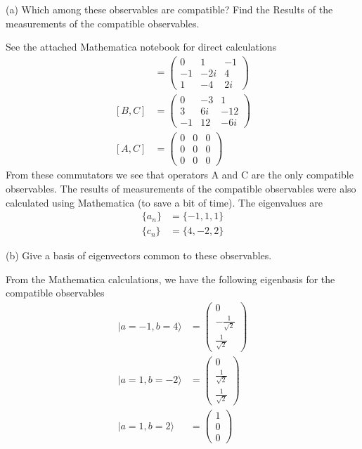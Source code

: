\documentclass[a4paper, 11pt]{article}
\newcommand{\ket}[1]{|#1\rangle}
\newenvironment{solution}{%
	\begin{list}{}{%
			\setlength{\topsep}{0pt}%
			\setlength{\leftmargin}{1.5cm}%
			\setlength{\rightmargin}{1.5cm}%
			\setlength{\listparindent}{\parindent}%
			\setlength{\itemindent}{\parindent}%
			\setlength{\parsep}{\parskip}%
		}%
		\item[]}{\end{list}}
\begin{document}
\noindent (a) Which among these observables are compatible? Find the Results of the measurements of the compatible observables. 
	\begin{solution}
		See the attached Mathematica notebook for direct calculations 
			\begin{align*}
				[A, B] &= \begin{pmatrix}
					0 & 1 & -1 \\ 
					-1 & -2i & 4 \\ 
					1 & -4 & 2i
				\end{pmatrix} \\ 
				[B, C] &= \begin{pmatrix}
					0 & -3 & 1 \\ 
					3 & 6i & -12 \\ 
					-1 & 12 & -6i
				\end{pmatrix} \\ 
				[A,C] &= \begin{pmatrix}
					0 & 0 & 0 \\ 
					0 & 0 & 0 \\ 
					0 & 0 & 0 
				\end{pmatrix}
			\end{align*}
		From these commutators we see that operators A and C are the only compatible observables. The results of measurements of the compatible observables were also calculated using Mathematica (to save a bit of time). The eigenvalues are
			\begin{align*}
				\{a_n\} &= \{-1, 1, 1\} \\ 
				\{c_n\} &= \{4, -2, 2\}
			\end{align*}
	\end{solution}

\noindent (b) Give a basis of eigenvectors common to these observables. 
	\begin{solution}
		From the Mathematica calculations, we have the following eigenbasis for the compatible observables
			\begin{align*}
				\ket{a=-1, b=4} &= \begin{pmatrix} 0 \\ -\frac{1}{\sqrt{2}} \\ \frac{1}{\sqrt{2}} \end{pmatrix} \\ 
				\ket{a=1, b=-2} &= \begin{pmatrix}0 \\ \frac{1}{\sqrt{2}} \\ \frac{1}{\sqrt{2}}  \end{pmatrix} \\ 
				\ket{a=1, b=2} &= \begin{pmatrix} 1 \\ 0 \\ 0 \end{pmatrix}
			\end{align*}
	\end{solution}
\end{document}
